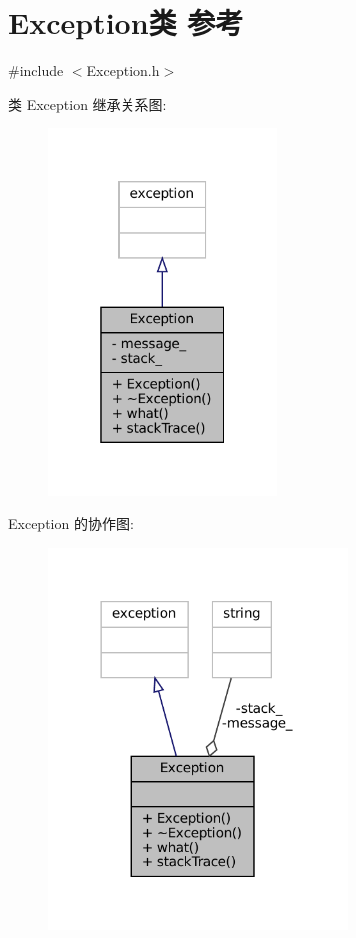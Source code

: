 \hypertarget{classmuduo_1_1Exception}{}\section{Exception类 参考}
\label{classmuduo_1_1Exception}


{\ttfamily \#include $<$Exception.\+h$>$}



类 Exception 继承关系图\+:
\nopagebreak
\begin{figure}[H]
\begin{center}
\leavevmode
\includegraphics[width=172pt]{classmuduo_1_1Exception__inherit__graph}
\end{center}
\end{figure}


Exception 的协作图\+:
\nopagebreak
\begin{figure}[H]
\begin{center}
\leavevmode
\includegraphics[width=225pt]{classmuduo_1_1Exception__coll__graph}
\end{center}
\end{figure}
